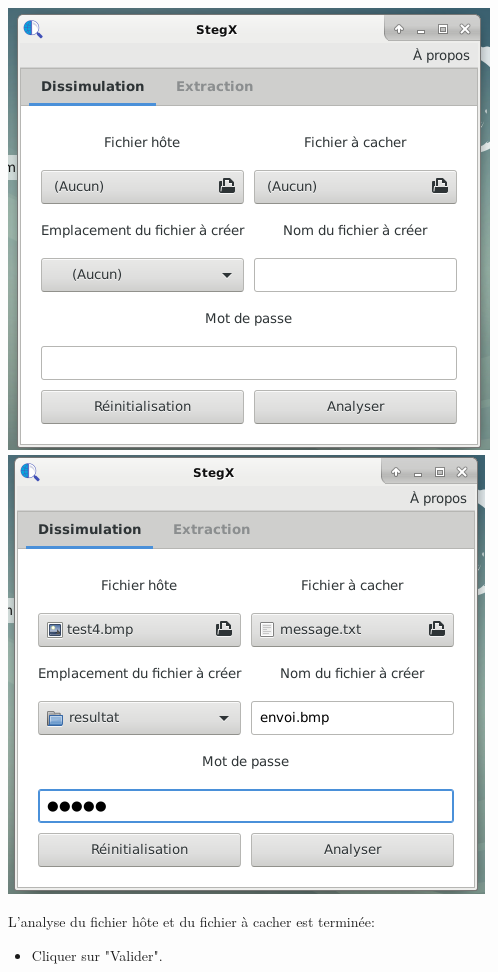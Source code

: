 \documentclass[11pt]{article}
\begin{document}
\vspace{0.5cm}
\hspace{-2cm}
\includegraphics[scale=0.8]{pictures/ouverture2.png}
\vspace{1cm}
\hspace{0.2cm}
\includegraphics[scale=0.8]{pictures/insertion_1.png}

L'analyse du fichier hôte et du fichier à cacher est terminée: 
\begin{itemize}
\item Cliquer sur "Valider". 
\end{itemize}
\end{document}
